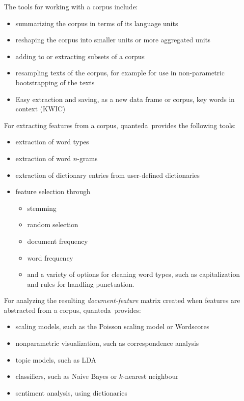 \documentclass[11pt]{article}
\newcommand{\quanteda}{\textsf{quanteda}\ }
\begin{document}
The tools for working with a corpus include:
\begin{itemize}
\item summarizing the corpus in terms of its language units
\item reshaping the corpus into smaller units or more aggregated units
\item adding to or extracting subsets of a corpus
\item resampling texts of the corpus, for example for use in
  non-parametric bootstrapping of the texts \citep[for an example, see][]{lowebenoitPA2013}
  \item Easy extraction and saving, as a new data frame or corpus, key
    words in context (KWIC)
\end{itemize}

For extracting features from a corpus, \quanteda provides the following tools:
\begin{itemize}
\item extraction of word types
\item extraction of word $n$-grams
\item extraction of dictionary entries from user-defined dictionaries
\item feature selection through
  \begin{itemize}
  \item stemming
  \item random selection
  \item document frequency
  \item word frequency
  \item and a variety of options for cleaning word types, such as
    capitalization and rules for handling punctuation.
  \end{itemize}
\end{itemize}

For analyzing the resulting \emph{document-feature} matrix created
when features are abstracted from a corpus, \quanteda provides:
\begin{itemize}
\item scaling models, such as the Poisson scaling model or Wordscores
\item nonparametric visualization, such as correspondence analysis
\item topic models, such as LDA
\item classifiers, such as Naive Bayes or $k$-nearest neighbour
\item sentiment analysis, using dictionaries
\end{itemize}
\end{document}

